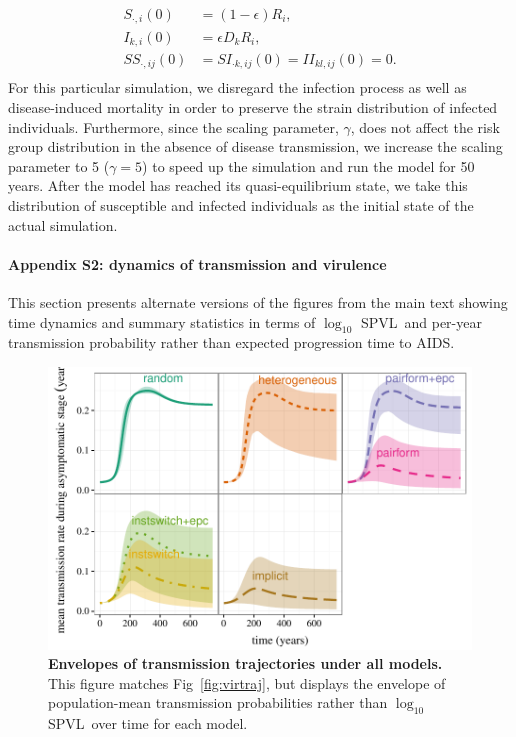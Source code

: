 \documentclass[10pt,letterpaper]{article}
\renewcommand{\figurename}{Fig}
\newcommand{\Lspvl}{$\log_{10}$ SPVL}
\begin{document}
\begin{equation}
\begin{aligned}
S_{\cdot,i}(0) &= (1 - \epsilon) R_i,\\
I_{k,i}(0) &= \epsilon D_k R_i,\\
SS_{\cdot,ij}(0) &= SI_{\cdot k, ij}(0) = II_{kl,ij} (0) = 0.\\
\end{aligned}
\end{equation}
For this particular simulation, we disregard the infection process as well as disease-induced mortality in order to preserve the strain distribution of infected individuals. Furthermore, since the scaling parameter, $\gamma$, does not affect the risk group distribution in the absence of disease transmission, we increase the scaling parameter to 5 ($\gamma = 5$) to speed up the simulation and run the model for 50 years. After the model has reached its quasi-equilibrium state, we take this distribution of susceptible and infected individuals as the initial state of the actual simulation.

\paragraph*{Appendix S2: dynamics of transmission and virulence}

\label{S2_Appendix}

This section presents alternate versions of
the figures from the main text showing time dynamics and summary
statistics in terms of \Lspvl\ and per-year transmission probability
rather than expected progression time to AIDS.

\begin{figure}[!ht]
\includegraphics[width=\textwidth]{../figures/fig_S2_1.pdf}
\caption{{\bf Envelopes of transmission trajectories under all models.}
This figure matches \figurename~\ref{fig:virtraj}, but displays the
envelope of population-mean transmission probabilities rather than \Lspvl\ over time
for each model.
}
\label{fig:transtraj}
\end{figure}
\end{document}
